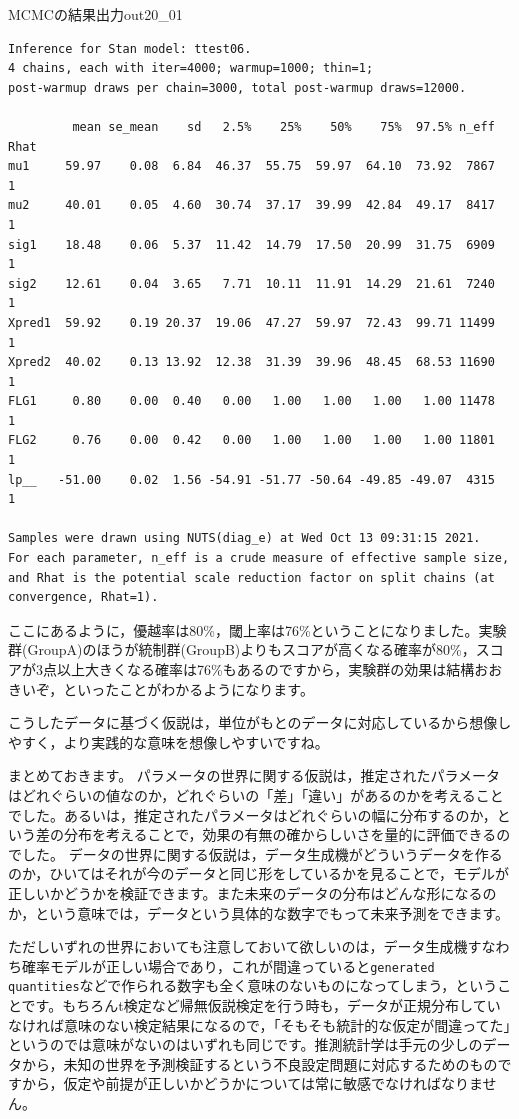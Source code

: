 \documentclass{ltjsbook}
\begin{document}
\begin{SCrstan}{MCMCの結果出力}{out20_01}
    \begin{verbatim}
Inference for Stan model: ttest06.
4 chains, each with iter=4000; warmup=1000; thin=1; 
post-warmup draws per chain=3000, total post-warmup draws=12000.

         mean se_mean    sd   2.5%    25%    50%    75%  97.5% n_eff Rhat
mu1     59.97    0.08  6.84  46.37  55.75  59.97  64.10  73.92  7867    1
mu2     40.01    0.05  4.60  30.74  37.17  39.99  42.84  49.17  8417    1
sig1    18.48    0.06  5.37  11.42  14.79  17.50  20.99  31.75  6909    1
sig2    12.61    0.04  3.65   7.71  10.11  11.91  14.29  21.61  7240    1
Xpred1  59.92    0.19 20.37  19.06  47.27  59.97  72.43  99.71 11499    1
Xpred2  40.02    0.13 13.92  12.38  31.39  39.96  48.45  68.53 11690    1
FLG1     0.80    0.00  0.40   0.00   1.00   1.00   1.00   1.00 11478    1
FLG2     0.76    0.00  0.42   0.00   1.00   1.00   1.00   1.00 11801    1
lp__   -51.00    0.02  1.56 -54.91 -51.77 -50.64 -49.85 -49.07  4315    1

Samples were drawn using NUTS(diag_e) at Wed Oct 13 09:31:15 2021.
For each parameter, n_eff is a crude measure of effective sample size,
and Rhat is the potential scale reduction factor on split chains (at 
convergence, Rhat=1).
   \end{verbatim}
\end{SCrstan}

ここにあるように，優越率は80\%，閾上率は76\%ということになりました。実験群(GroupA)のほうが統制群(GroupB)よりもスコアが高くなる確率が80\%，スコアが3点以上大きくなる確率は76\%もあるのですから，実験群の効果は結構おおきいぞ，といったことがわかるようになります。

こうしたデータに基づく仮説は，単位がもとのデータに対応しているから想像しやすく，より実践的な意味を想像しやすいですね。

まとめておきます。
パラメータの世界に関する仮説は，推定されたパラメータはどれぐらいの値なのか，どれぐらいの「差」「違い」があるのかを考えることでした。あるいは，推定されたパラメータはどれぐらいの幅に分布するのか，という差の分布を考えることで，効果の有無の確からしいさを量的に評価できるのでした。
データの世界に関する仮説は，データ生成機がどういうデータを作るのか，ひいてはそれが今のデータと同じ形をしているかを見ることで，モデルが正しいかどうかを検証できます。また未来のデータの分布はどんな形になるのか，という意味では，データという具体的な数字でもって未来予測をできます。

ただしいずれの世界においても注意しておいて欲しいのは，データ生成機すなわち確率モデルが正しい場合であり，これが間違っていると\verb|generated quantities|などで作られる数字も全く意味のないものになってしまう，ということです。もちろんt検定など帰無仮説検定を行う時も，データが正規分布していなければ意味のない検定結果になるので，「そもそも統計的な仮定が間違ってた」というのでは意味がないのはいずれも同じです。推測統計学は手元の少しのデータから，未知の世界を予測検証するという不良設定問題に対応するためのものですから，仮定や前提が正しいかどうかについては常に敏感でなければなりません。
\end{document}
